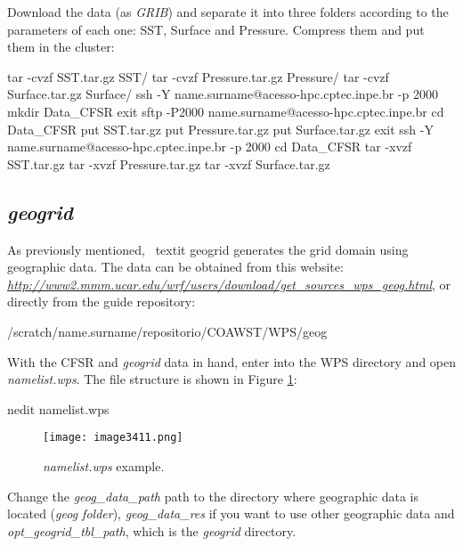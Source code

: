\noindent Download the data (as \textit{GRIB}) and separate it into three folders according to the parameters of each one:
SST, Surface and Pressure. Compress them and put them in the cluster:
\bigskip

\begin{bashcode}
tar -cvzf SST.tar.gz SST/
tar -cvzf Pressure.tar.gz Pressure/
tar -cvzf Surface.tar.gz Surface/
ssh -Y name.surname@acesso-hpc.cptec.inpe.br -p 2000
mkdir Data_CFSR
exit
sftp -P2000 name.surname@acesso-hpc.cptec.inpe.br
cd Data_CFSR
put SST.tar.gz
put Pressure.tar.gz
put Surface.tar.gz
exit
ssh -Y name.surname@acesso-hpc.cptec.inpe.br -p 2000
cd Data_CFSR
tar -xvzf SST.tar.gz
tar -xvzf Pressure.tar.gz
tar -xvzf Surface.tar.gz
\end{bashcode}
\bigskip

\subsection{\textit{geogrid}}\label{geowps}
\bigskip

\noindent As previously mentioned, \ textit {geogrid} generates the grid domain using geographic data. The data can be obtained from this website:
\textcolor{bleu_cite}{\href{http://www2.mmm.ucar.edu/wrf/users/download/get\_sources\_wps\_geog.html}{\textit{http://www2.mmm.ucar.edu/wrf/users/download/get\_sources\_wps\_geog.html}}}, 
or directly from the guide repository:
\bigskip

\begin{bashcode}
/scratch/name.surname/repositorio/COAWST/WPS/geog
\end{bashcode}
\bigskip

\noindent With the CFSR and \textit{geogrid} data in hand, enter into the WPS directory and open \textit{namelist.wps}. 
The file structure is shown in Figure \textcolor{bleu_cite}{\ref{namelistwps}}:
\bigskip

\begin{bashcode}
nedit namelist.wps
\end{bashcode}
\bigskip

\begin{figure}[H]
    \centering
    \texttt{[image: image3411.png]}
    \caption{\textit{namelist.wps} example.}
    \label{namelistwps}
\end{figure}
\bigskip

\noindent Change the \textit{geog\_data\_path} path to the directory where geographic data is located (\textit{geog folder}), 
\textit{geog\_data\_res} if you want to use other geographic data and \textit{opt\_geogrid\_tbl\_path}, which is the 
\textit{geogrid} directory.

